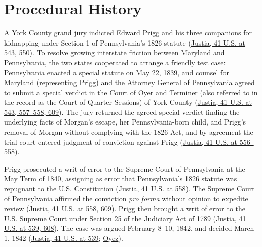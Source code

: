 \documentclass[12pt]{article}
\begin{document}
\section{Procedural History}
A York County grand jury indicted Edward Prigg and his three companions for kidnapping under Section 1 of Pennsylvania's 1826 statute (\href{https://supreme.justia.com/cases/federal/us/41/539/}{Justia, 41 U.S. at 543, 550}). To resolve growing interstate friction between Maryland and Pennsylvania, the two states cooperated to arrange a friendly test case: Pennsylvania enacted a special statute on May 22, 1839, and counsel for Maryland (representing Prigg) and the Attorney General of Pennsylvania agreed to submit a special verdict in the Court of Oyer and Terminer (also referred to in the record as the Court of Quarter Sessions) of York County (\href{https://supreme.justia.com/cases/federal/us/41/539/}{Justia, 41 U.S. at 543, 557--558, 609}). The jury returned the agreed special verdict finding the underlying facts of Morgan's escape, her Pennsylvania-born child, and Prigg's removal of Morgan without complying with the 1826 Act, and by agreement the trial court entered judgment of conviction against Prigg (\href{https://supreme.justia.com/cases/federal/us/41/539/}{Justia, 41 U.S. at 556--558}).

Prigg prosecuted a writ of error to the Supreme Court of Pennsylvania at the May Term of 1840, assigning as error that Pennsylvania's 1826 statute was repugnant to the U.S. Constitution (\href{https://supreme.justia.com/cases/federal/us/41/539/}{Justia, 41 U.S. at 558}). The Supreme Court of Pennsylvania affirmed the conviction \textit{pro forma} without opinion to expedite review (\href{https://supreme.justia.com/cases/federal/us/41/539/}{Justia, 41 U.S. at 558, 609}). Prigg then brought a writ of error to the U.S. Supreme Court under Section 25 of the Judiciary Act of 1789 (\href{https://supreme.justia.com/cases/federal/us/41/539/}{Justia, 41 U.S. at 539, 608}). The case was argued February 8--10, 1842, and decided March 1, 1842 (\href{https://supreme.justia.com/cases/federal/us/41/539/}{Justia, 41 U.S. at 539}; \href{https://www.oyez.org/cases/1789-1850/41us539}{Oyez}).
\end{document}
